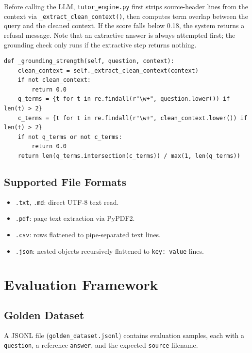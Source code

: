 \documentclass[12pt,a4paper]{article}
\begin{document}
Before calling the LLM, \texttt{tutor\_engine.py} first strips source-header lines
from the context via \texttt{\_extract\_clean\_context()}, then computes term overlap
between the query and the cleaned context. If the score falls below 0.18, the system
returns a refusal message. Note that an extractive answer is always attempted first;
the grounding check only runs if the extractive step returns nothing.

\begin{lstlisting}[caption={Grounding strength check in tutor\_engine.py}]
def _grounding_strength(self, question, context):
    clean_context = self._extract_clean_context(context)
    if not clean_context:
        return 0.0
    q_terms = {t for t in re.findall(r"\w+", question.lower()) if len(t) > 2}
    c_terms = {t for t in re.findall(r"\w+", clean_context.lower()) if len(t) > 2}
    if not q_terms or not c_terms:
        return 0.0
    return len(q_terms.intersection(c_terms)) / max(1, len(q_terms))
\end{lstlisting}

\subsection{Supported File Formats}

\begin{itemize}[leftmargin=*]
  \item \texttt{.txt}, \texttt{.md}: direct UTF-8 text read.
  \item \texttt{.pdf}: page text extraction via PyPDF2.
  \item \texttt{.csv}: rows flattened to pipe-separated text lines.
  \item \texttt{.json}: nested objects recursively flattened to \texttt{key: value} lines.
\end{itemize}

\section{Evaluation Framework}

\subsection{Golden Dataset}

A JSONL file (\texttt{golden\_dataset.jsonl}) contains evaluation samples, each with
a \texttt{question}, a reference \texttt{answer}, and the expected \texttt{source}
filename.
\end{document}
